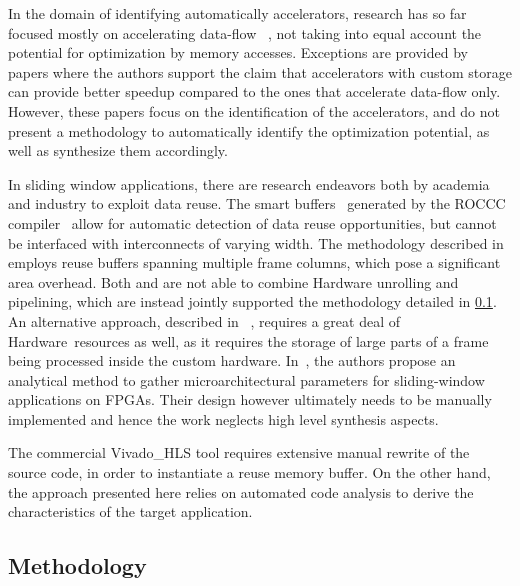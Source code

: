 \documentclass[]{usiinfthesis}
\newcommand{\HW}{{Hardware}}
\begin{document}
In the domain of identifying automatically accelerators, research has 
so far focused mostly on accelerating data-flow~\cite{GiaquintaMar15} \cite{GutinFeb12}, 
not taking into equal account the potential for optimization by memory accesses. 
Exceptions are provided by papers \cite{BiswasMar06} \cite{ HaaBOct2014}
where the authors support the claim that accelerators with custom
storage can provide better speedup compared to the ones that
accelerate data-flow only. However, these papers focus on the
identification of the accelerators, and do not present a methodology 
to automatically identify the optimization potential, as well as
synthesize them accordingly.\par
In sliding window applications, there are research endeavors
both by academia and industry to exploit data reuse. The smart
buffers~\cite{GuoJun04} generated by the ROCCC
compiler~\cite{VillarrealMay10} allow for automatic detection of data
reuse opportunities, but cannot be interfaced 
with interconnects of varying width.
%
The methodology
described in \cite{MeeusMar14} employs reuse buffers spanning multiple
frame columns, which pose a significant area
overhead. Both \cite{GuoJun04} and \cite{MeeusMar14} are not able
to combine Hardware unrolling and pipelining, which are instead jointly
supported the methodology detailed in \ref{sec:dr_meth}. An alternative 
approach, described in
~\cite{DongMar07}, requires a great deal of \HW\ resources as well, as it 
requires the storage of large parts of a frame being processed inside the custom
hardware.  In~\cite{LeeserApr06}, the authors propose an analytical
method to gather microarchitectural parameters for sliding-window
applications on FPGAs. Their design however ultimately needs to be
manually implemented and hence the work neglects high level synthesis
aspects.\par
%
The commercial Vivado\_HLS tool requires
extensive manual rewrite of the source code, in order to instantiate
a reuse memory buffer. On the other hand, the approach presented 
here relies on automated code
analysis to derive the characteristics of the target application.\par 



\subsection{Methodology}
\label{sec:dr_meth}
\end{document}
